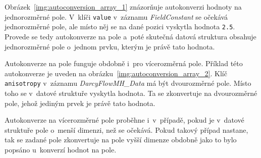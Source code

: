\documentclass[FM,bw,DP]{tulthesis}
\begin{document}
Obrázek~\ref{img:autoconversion_array_1} znázorňuje autokonverzi hodnoty na jednorozměrné pole. V~klíči \texttt{value} v~záznamu \textit{FieldConstant} se očekává jednorozměrné pole, ale místo něj se na dané pozici vyskytla hodnota \texttt{2.5}. Provede se tedy autokonverze na pole a~poté skutečná datová struktura obsahuje jednorozměrné pole o~jednom prvku, kterým je právě tato hodnota.

Autokonverze na pole funguje obdobně i~pro vícerozměrná pole. Příklad této autokonverze je uveden na obrázku~\ref{img:autoconversion_array_2}. Klíč \texttt{anisotropy} v~záznamu \textit{DarcyFlowMH\_Data} má být dvourozměrné pole. Místo toho se v~datové struktuře vyskytla hodnota. Ta se zkonvertuje na dvourozměrné pole, jehož jediným prvek je právě tato hodnota.

Autokonverze na vícerozměrné pole proběhne i~v~případě, pokud je v~datové struktuře pole o~menší dimenzi, než se očekává. Pokud takový případ nastane, tak se zadané pole zkonvertuje na pole vyšší dimenze obdobně jako to bylo popsáno u~konverzí hodnot na pole.

\end{document}
